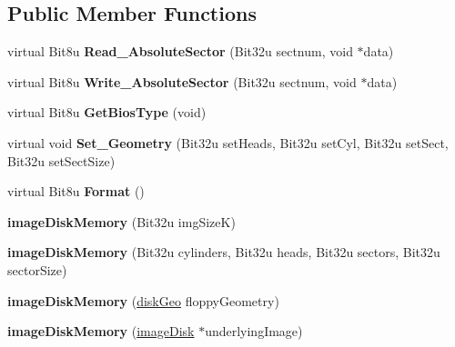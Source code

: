\subsection*{Public Member Functions}
\begin{DoxyCompactItemize}
\item 
\hypertarget{classimageDiskMemory_a67a4fdb7bfea226898ca6c9801350708}{virtual Bit8u {\bfseries Read\-\_\-\-Absolute\-Sector} (Bit32u sectnum, void $\ast$data)}\label{classimageDiskMemory_a67a4fdb7bfea226898ca6c9801350708}

\item 
\hypertarget{classimageDiskMemory_a5baed0452656feaad2c7a9157af0b2b5}{virtual Bit8u {\bfseries Write\-\_\-\-Absolute\-Sector} (Bit32u sectnum, void $\ast$data)}\label{classimageDiskMemory_a5baed0452656feaad2c7a9157af0b2b5}

\item 
\hypertarget{classimageDiskMemory_a608088213822277c5fa95c90929d4ec2}{virtual Bit8u {\bfseries Get\-Bios\-Type} (void)}\label{classimageDiskMemory_a608088213822277c5fa95c90929d4ec2}

\item 
\hypertarget{classimageDiskMemory_a72accc9b21eae2c51f9960803501e221}{virtual void {\bfseries Set\-\_\-\-Geometry} (Bit32u set\-Heads, Bit32u set\-Cyl, Bit32u set\-Sect, Bit32u set\-Sect\-Size)}\label{classimageDiskMemory_a72accc9b21eae2c51f9960803501e221}

\item 
\hypertarget{classimageDiskMemory_a23db6ca32da16437703d513ad9500138}{virtual Bit8u {\bfseries Format} ()}\label{classimageDiskMemory_a23db6ca32da16437703d513ad9500138}

\item 
\hypertarget{classimageDiskMemory_ae32d8a89882a15795e0199b0c0f08df3}{{\bfseries image\-Disk\-Memory} (Bit32u img\-Size\-K)}\label{classimageDiskMemory_ae32d8a89882a15795e0199b0c0f08df3}

\item 
\hypertarget{classimageDiskMemory_a24a38d78040f47ba1e405c04abc3a05c}{{\bfseries image\-Disk\-Memory} (Bit32u cylinders, Bit32u heads, Bit32u sectors, Bit32u sector\-Size)}\label{classimageDiskMemory_a24a38d78040f47ba1e405c04abc3a05c}

\item 
\hypertarget{classimageDiskMemory_a381a4894bb6e5931f75877728d40f0e8}{{\bfseries image\-Disk\-Memory} (\hyperlink{structdiskGeo}{disk\-Geo} floppy\-Geometry)}\label{classimageDiskMemory_a381a4894bb6e5931f75877728d40f0e8}

\item 
\hypertarget{classimageDiskMemory_a45479f6fe646d2e184809cd5c37dc1d8}{{\bfseries image\-Disk\-Memory} (\hyperlink{classimageDisk}{image\-Disk} $\ast$underlying\-Image)}\label{classimageDiskMemory_a45479f6fe646d2e184809cd5c37dc1d8}

\end{DoxyCompactItemize}


